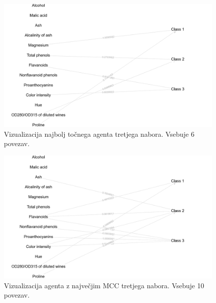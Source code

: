 \begin{figure}[H]
    \begin{center}
        \includegraphics[width=13cm]{wine/3/acc_g}
    \end{center}
    \caption{Vizualizacija najbolj točnega agenta tretjega nabora. Vsebuje 6 povezav.}
    \label{fig:wine_acc_3_g}
\end{figure}

\begin{figure}[H]
    \begin{center}
        \includegraphics[width=13cm]{wine/3/mcc_g}
    \end{center}
    \caption{Vizualizacija agenta z največjim MCC tretjega nabora. Vsebuje 10 povezav.}
    \label{fig:wine_mcc_3_g}
\end{figure}